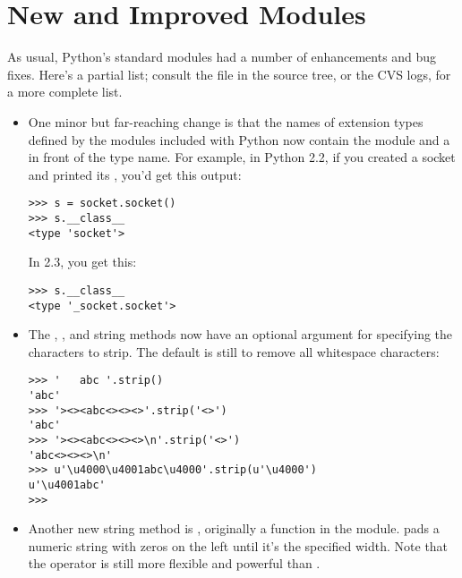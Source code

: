 \documentclass{howto}
\begin{document}
\begin{seealso}


\end{seealso}


\section{New and Improved Modules}

As usual, Python's standard modules had a number of enhancements and
bug fixes.  Here's a partial list; consult the  file
in the source tree, or the CVS logs, for a more complete list.

\begin{itemize}

\item One minor but far-reaching change is that the names of extension
types defined by the modules included with Python now contain the
module and a  in front of the type name.  For example, in
Python 2.2, if you created a socket and printed its
, you'd get this output:

\begin{verbatim}
>>> s = socket.socket()
>>> s.__class__
<type 'socket'>
\end{verbatim}

In 2.3, you get this:
\begin{verbatim}
>>> s.__class__
<type '_socket.socket'>
\end{verbatim}

\item The , , and 
string methods now have an optional argument for specifying the
characters to strip.  The default is still to remove all whitespace
characters:

\begin{verbatim}
>>> '   abc '.strip()
'abc'
>>> '><><abc<><><>'.strip('<>')
'abc'
>>> '><><abc<><><>\n'.strip('<>')
'abc<><><>\n'
>>> u'\u4000\u4001abc\u4000'.strip(u'\u4000')
u'\u4001abc'
>>>
\end{verbatim}

\item Another new string method is , originally a
function in the  module.   pads a
numeric string with zeros on the left until it's the specified width.
Note that the \code{\%} operator is still more flexible and powerful
than .


\end{itemize}
\end{document}
